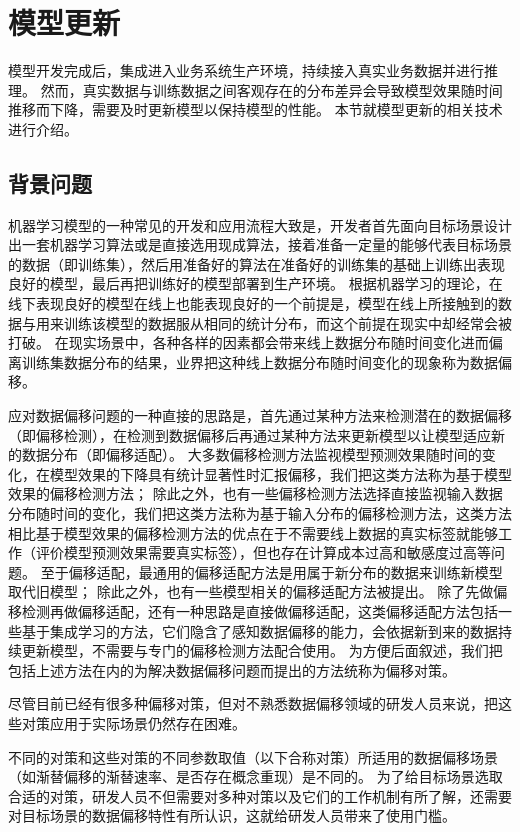 \section{模型更新}

模型开发完成后，集成进入业务系统生产环境，持续接入真实业务数据并进行推理。
然而，真实数据与训练数据之间客观存在的分布差异会导致模型效果随时间推移而下降，需要及时更新模型以保持模型的性能。
本节就模型更新的相关技术进行介绍。

\subsection{背景问题}

机器学习模型的一种常见的开发和应用流程大致是，开发者首先面向目标场景设计出一套机器学习算法或是直接选用现成算法，接着准备一定量的能够代表目标场景的数据（即训练集），然后用准备好的算法在准备好的训练集的基础上训练出表现良好的模型，最后再把训练好的模型部署到生产环境。
根据机器学习的理论，在线下表现良好的模型在线上也能表现良好的一个前提是，模型在线上所接触到的数据与用来训练该模型的数据服从相同的统计分布，而这个前提在现实中却经常会被打破。
在现实场景中，各种各样的因素都会带来线上数据分布随时间变化进而偏离训练集数据分布的结果，业界把这种线上数据分布随时间变化的现象称为数据偏移。

应对数据偏移问题的一种直接的思路是，首先通过某种方法来检测潜在的数据偏移（即偏移检测），在检测到数据偏移后再通过某种方法来更新模型以让模型适应新的数据分布（即偏移适配）。
大多数偏移检测方法监视模型预测效果随时间的变化，在模型效果的下降具有统计显著性时汇报偏移，我们把这类方法称为基于模型效果的偏移检测方法；
除此之外，也有一些偏移检测方法选择直接监视输入数据分布随时间的变化，我们把这类方法称为基于输入分布的偏移检测方法，这类方法相比基于模型效果的偏移检测方法的优点在于不需要线上数据的真实标签就能够工作（评价模型预测效果需要真实标签），但也存在计算成本过高和敏感度过高等问题。
至于偏移适配，最通用的偏移适配方法是用属于新分布的数据来训练新模型取代旧模型；
除此之外，也有一些模型相关的偏移适配方法被提出。
除了先做偏移检测再做偏移适配，还有一种思路是直接做偏移适配，这类偏移适配方法包括一些基于集成学习的方法，它们隐含了感知数据偏移的能力，会依据新到来的数据持续更新模型，不需要与专门的偏移检测方法配合使用。
为方便后面叙述，我们把包括上述方法在内的为解决数据偏移问题而提出的方法统称为偏移对策。

尽管目前已经有很多种偏移对策，但对不熟悉数据偏移领域的研发人员来说，把这些对策应用于实际场景仍然存在困难。

不同的对策和这些对策的不同参数取值（以下合称对策）所适用的数据偏移场景（如渐替偏移的渐替速率、是否存在概念重现）是不同的。
为了给目标场景选取合适的对策，研发人员不但需要对多种对策以及它们的工作机制有所了解，还需要对目标场景的数据偏移特性有所认识，这就给研发人员带来了使用门槛。

